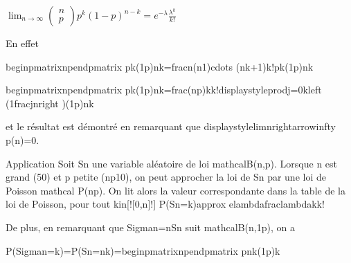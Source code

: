 \documentclass[letterpaper,10pt,french]{sphinxmanual}
\begin{document}
\sphinxAtStartPar
\(\displaystyle\lim_{n\rightarrow\infty}\begin{pmatrix}n\\p\end{pmatrix} p^k(1-p)^{n-k} = e^{-\lambda}\frac{\lambda^k}{k!}\)

\begin{sphinxVerbatim}[commandchars=\\\{\}]
En effet 

\PYGZdl{}\PYGZbs{}begin\PYGZob{}pmatrix\PYGZcb{}n\PYGZbs{}\PYGZbs{}p\PYGZbs{}end\PYGZob{}pmatrix\PYGZcb{} p\PYGZca{}k(1\PYGZhy{}p)\PYGZca{}\PYGZob{}n\PYGZhy{}k\PYGZcb{}=\PYGZbs{}frac\PYGZob{}n(n\PYGZhy{}1)\PYGZbs{}cdots (n\PYGZhy{}k+1)\PYGZcb{}\PYGZob{}k!\PYGZcb{}p\PYGZca{}k(1\PYGZhy{}p)\PYGZca{}\PYGZob{}n\PYGZhy{}k\PYGZcb{}\PYGZdl{}

\PYGZdl{}\PYGZbs{}begin\PYGZob{}pmatrix\PYGZcb{}n\PYGZbs{}\PYGZbs{}p\PYGZbs{}end\PYGZob{}pmatrix\PYGZcb{} p\PYGZca{}k(1\PYGZhy{}p)\PYGZca{}\PYGZob{}n\PYGZhy{}k\PYGZcb{}=\PYGZbs{}frac\PYGZob{}(np)\PYGZca{}k\PYGZcb{}\PYGZob{}k!\PYGZcb{}\PYGZbs{}displaystyle\PYGZbs{}prod\PYGZus{}\PYGZob{}j=0\PYGZcb{}\PYGZca{}k\PYGZbs{}left (1\PYGZhy{}\PYGZbs{}frac\PYGZob{}j\PYGZcb{}\PYGZob{}n\PYGZcb{}\PYGZbs{}right )(1\PYGZhy{}p)\PYGZca{}\PYGZob{}n\PYGZhy{}k\PYGZcb{}\PYGZdl{}


et le résultat est démontré en remarquant que \PYGZdl{}\PYGZbs{}displaystyle\PYGZbs{}lim\PYGZus{}\PYGZob{}n\PYGZbs{}rightarrow\PYGZbs{}infty\PYGZcb{} p(n)=0\PYGZdl{}.


\PYGZsh{}\PYGZsh{}\PYGZsh{} Application
Soit \PYGZdl{}S\PYGZus{}n\PYGZdl{} une variable aléatoire de loi \PYGZdl{}\PYGZbs{}mathcal\PYGZob{}B\PYGZcb{}(n,p)\PYGZdl{}. Lorsque \PYGZdl{}n\PYGZdl{} est grand (\PYGZgt{}50) et \PYGZdl{}p\PYGZdl{} petite (\PYGZdl{}np\PYGZdl{}\PYGZlt{}10), on peut approcher la loi de \PYGZdl{}S\PYGZus{}n\PYGZdl{} par une loi de Poisson \PYGZdl{}\PYGZbs{}mathcal P(np)\PYGZdl{}. On lit alors la valeur correspondante dans la table de la loi de Poisson, pour tout \PYGZdl{}k\PYGZbs{}in[\PYGZbs{}![0,n]\PYGZbs{}!]\PYGZdl{} 
\PYGZdl{}P(S\PYGZus{}n=k)\PYGZbs{}approx e\PYGZca{}\PYGZob{}\PYGZhy{}\PYGZbs{}lambda\PYGZcb{}\PYGZbs{}frac\PYGZob{}\PYGZbs{}lambda\PYGZca{}k\PYGZcb{}\PYGZob{}k!\PYGZcb{}\PYGZdl{}

De plus, en remarquant que \PYGZdl{}\PYGZbs{}Sigma\PYGZus{}n=n\PYGZhy{}S\PYGZus{}n\PYGZdl{} suit \PYGZdl{}\PYGZbs{}mathcal\PYGZob{}B\PYGZcb{}(n,1\PYGZhy{}p)\PYGZdl{}, on a 

\PYGZdl{}\PYGZdl{}P(\PYGZbs{}Sigma\PYGZus{}n=k)=P(S\PYGZus{}n=n\PYGZhy{}k)=\PYGZbs{}begin\PYGZob{}pmatrix\PYGZcb{}n\PYGZbs{}\PYGZbs{}p\PYGZbs{}end\PYGZob{}pmatrix\PYGZcb{} p\PYGZca{}\PYGZob{}n\PYGZhy{}k\PYGZcb{}(1\PYGZhy{}p)\PYGZca{}\PYGZob{}k\PYGZcb{} \PYGZdl{}\PYGZdl{}


\end{sphinxVerbatim}
\end{document}

